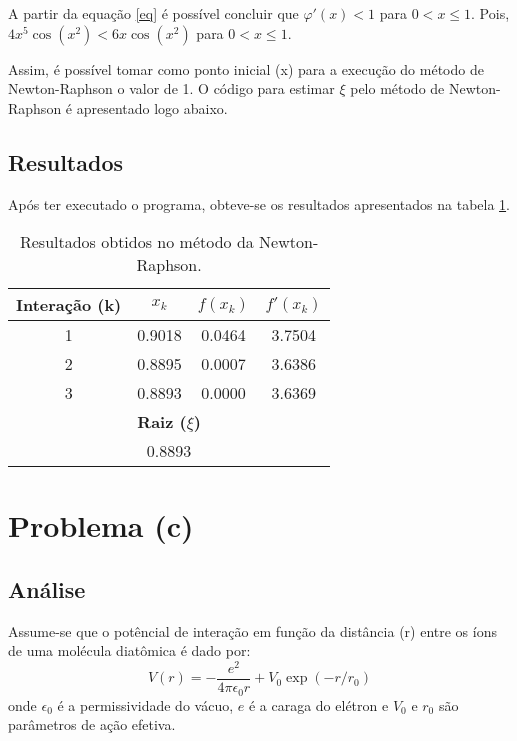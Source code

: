 \documentclass[a4paper,11pt, twoside]{article}
\newcommand{\n}[1]{\textbf{#1}}
\begin{document}
    A partir da equação \eqref{eq} é possível concluir que $\varphi'(x)<1$ para $0 < x \le 1$. Pois, $4x^5\cos(x^2) < 6x\cos(x^2)$
    para $0 < x \le 1$.
    
    Assim, é possível tomar como ponto inicial (x) para a execução do método de Newton-Raphson o valor de 1.
    O código para estimar $\xi$ pelo método de Newton-Raphson é apresentado logo abaixo.\\[0.15cm]
    
    {\linespread{1.15}
    }
    
    \subsection*{Resultados}
    Após ter executado o programa, obteve-se os resultados apresentados na tabela \ref{new}.
    {\linespread{1}
	\begin{table}[!th]
		\begin{center}
		    \begin{tabular}{ c c c c }
		        \toprule[0.11em]
		        \n{Interação (k)} & \n{$x_k$} & \n{$f(x_k)$} & \n{$f'(x_k)$}\\
		        \toprule[0.11em]
			1 & 0.9018 & 0.0464 & 3.7504\\
			\midrule
			2 & 0.8895 & 0.0007 & 3.6386\\
			\midrule
			3 & 0.8893 & 0.0000 & 3.6369\\
		        \toprule[0.11em]
		        \multicolumn{4}{c}{\n{Raiz ($\xi$)}}\\
		        \toprule[0.11em]
		        \multicolumn{4}{c}{0.8893}\\
		        \midrule
		    \end{tabular}
		\end{center}
		\caption{Resultados obtidos no método da Newton-Raphson.\label{new}}
	\end{table}}
	
	\section*{Problema (c)}
	\subsection*{Análise}
	Assume-se que o potêncial de interação em função da distância (r)
	entre os íons de uma molécula diatômica é dado
	por:
	\begin{equation}\label{pot}
	    V(r) = -\frac{e^2}{4\pi\epsilon_0 r} + V_0\exp{(-r / r_0)}
	\end{equation}
	onde $\epsilon_0$ é a permissividade do vácuo,  $e$ é a caraga do elétron e $V_0$ e $r_0$ são
	parâmetros de ação efetiva.
	
\end{document}
